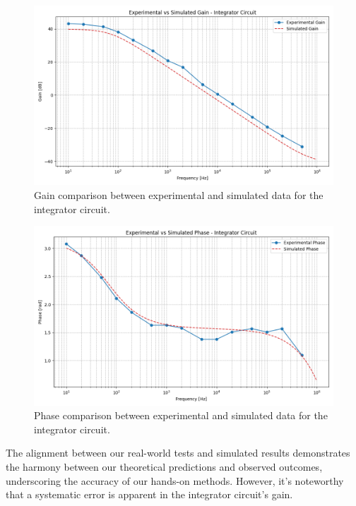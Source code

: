 		\begin{figure}[H]
		    \centering
		    \includegraphics[width=1\textwidth]{figures/integrator/gain_plot.png}
		    \caption{Gain comparison between experimental and simulated data for the integrator circuit.}
		    \label{fig:integrator_gain}
		\end{figure}

		\begin{figure}[H]
		    \centering
		    \includegraphics[width=1\textwidth]{figures/integrator/phase_plot.png}
		    \caption{Phase comparison between experimental and simulated data for the integrator circuit.}
		    \label{fig:integrator_phase}
		\end{figure} 

		\noindent
		The alignment between our real-world tests and simulated results demonstrates the harmony between our theoretical predictions and observed outcomes, 
		underscoring the accuracy of our hands-on methods. However, it's noteworthy that a systematic error is apparent in the integrator circuit's gain.

